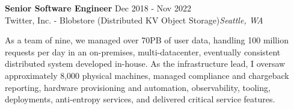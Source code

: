 \begin{mdframed}[linewidth=2,linecolor=blue, innertopmargin=1em, innerbottommargin=1em, topline=false, rightline=false, bottomline=false]
    \textbf{Senior Software Engineer} \hfill Dec 2018 - Nov 2022\\
    Twitter, Inc. - Blobstore (Distributed KV Object Storage)\hfill \textit{Seattle, WA}

    As a team of nine, we managed over 70PB of user data, handling 100 million requests per day in an on-premises, multi-datacenter, eventually consistent distributed system developed in-house. As the infrastructure lead, I oversaw approximately 8,000 physical machines, managed compliance and chargeback reporting, hardware provisioning and automation, observability, tooling, deployments, anti-entropy services, and delivered critical service features.
    

\end{mdframed}
